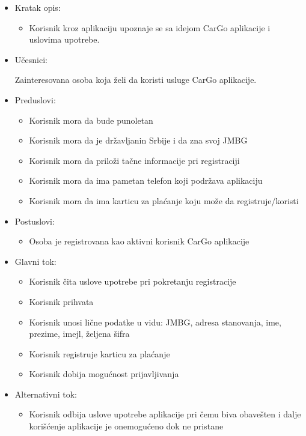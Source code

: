 \begin{itemize}
    \item Kratak opis:
        \begin{itemize}
            \item Korisnik kroz aplikaciju upoznaje se sa idejom CarGo aplikacije i uslovima upotrebe.
        \end{itemize}
    \item Učesnici:
        \begin{itemize}
            Zainteresovana osoba koja želi da koristi usluge CarGo aplikacije.
        \end{itemize}
    \item Preduslovi:
        \begin{itemize}
            \item Korisnik mora da bude punoletan
            \item Korisnik mora da je državljanin Srbije i da zna svoj JMBG
            \item Korisnik mora da priloži tačne informacije pri registraciji
            \item Korisnik mora da ima pametan telefon koji podržava aplikaciju
            \item Korisnik mora da ima karticu za plaćanje koju može da registruje/koristi
        \end{itemize}
    \item Postuslovi:
        \begin{itemize}
            \item Osoba je registrovana kao aktivni korisnik CarGo aplikacije
        \end{itemize}
    \item Glavni tok:
        \begin{itemize}
            \item Korisnik čita uslove upotrebe pri pokretanju registracije
            \item Korisnik prihvata 
            \item Korisnik unosi lične podatke u vidu: JMBG, adresa stanovanja, ime, prezime, imejl, željena šifra
            \item Korisnik registruje karticu za plaćanje
            \item Korisnik dobija mogućnost prijavljivanja
        \end{itemize}
    \item Alternativni tok:
        \begin{itemize}
            \item Korisnik odbija uslove upotrebe aplikacije pri čemu biva obavešten i dalje korišćenje aplikacije je onemogućeno dok ne pristane

\end{itemize}
\end{itemize}
